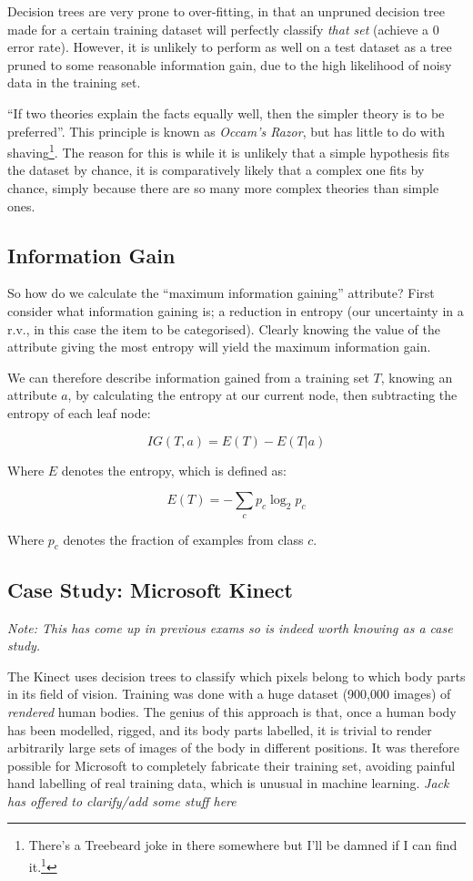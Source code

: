 \documentclass{article}
\begin{document}
    Decision trees are very prone to over-fitting, in that an unpruned decision tree made for a certain training dataset will perfectly classify \emph{that set} (achieve a 0 error rate). However, it is unlikely to perform as well on a test dataset as a tree pruned to some reasonable information gain, due to the high likelihood of noisy data in the training set.
    
    ``If two theories explain the facts equally well, then the simpler theory is to be preferred''. This principle is known as \emph{Occam's Razor}, but has little to do with shaving\footnote{There's a Treebeard joke in there somewhere but I'll be damned if I can find it.\footnote{YOU WHAT MATE??!?}}. The reason for this is while it is unlikely that a simple hypothesis fits the dataset by chance, it is comparatively likely that a complex one fits by chance, simply because there are so many more complex theories than simple ones.
    
    \subsection{Information Gain}
        So how do we calculate the ``maximum information gaining'' attribute? First consider what information gaining is; a reduction in entropy (our uncertainty in a r.v., in this case the item to be categorised). Clearly knowing the value of the attribute giving the most entropy will yield the maximum information gain. 
        
        We can therefore describe information gained from a training set $T$, knowing an attribute $a$, by calculating the entropy at our current node, then subtracting the entropy of each leaf node:
        
         $$ IG(T,a) = E(T) - E(T|a) $$

        Where $E$ denotes the entropy, which is defined as:
        
        $$ E(T) = -\sum\limits_{c} p_c \log_2p_c $$
        
        Where $p_c$ denotes the fraction of examples from class $c$.
        
    \subsection{Case Study: Microsoft Kinect}
        \emph{Note: This has come up in previous exams so is indeed worth knowing as a case study.}
        
        The Kinect uses decision trees to classify which pixels belong to which body parts in its field of vision. Training was done with a huge dataset (900,000 images) of \emph{rendered} human bodies. The genius of this approach is that, once a human body has been modelled, rigged, and its body parts labelled, it is trivial to render arbitrarily large sets of images of the body in different positions. It was therefore possible for Microsoft to completely fabricate their training set, avoiding painful hand labelling of real training data, which is unusual in machine learning.
        \emph{Jack has offered to clarify/add some stuff here}
\end{document}
